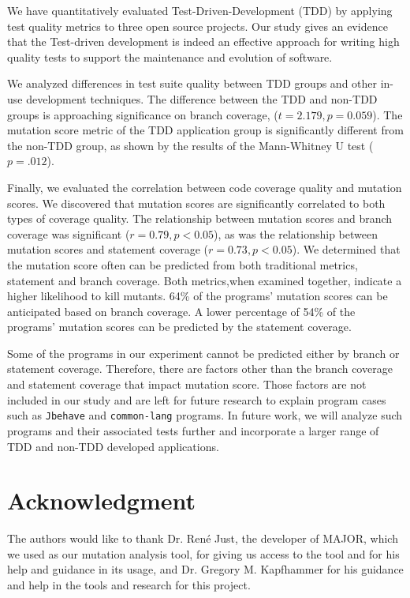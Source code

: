 \documentclass[conference]{IEEEtran}
\begin{document}
We have quantitatively evaluated Test-Driven-Development (TDD) by applying test quality metrics to three open source projects. Our study gives an evidence that the Test-driven development is indeed an effective approach for writing high quality tests to support the maintenance and evolution of software. 

We analyzed differences in test suite quality between TDD groups and other in-use development techniques. The difference between the TDD and non-TDD groups is approaching significance on branch coverage, ($t=2.179, p=0.059$). The mutation score metric of the TDD application group is significantly different from the non-TDD group, as shown by the results of the Mann-Whitney U test ($p = .012$).

Finally, we evaluated the correlation between code coverage quality and mutation scores. We discovered that mutation scores are significantly correlated to both types of coverage quality. The relationship between mutation scores and branch coverage was significant ($r = 0.79, p < 0.05$), as  was the relationship between mutation scores and  statement coverage ($r = 0.73, p < 0.05$). We determined that the mutation score often can be predicted from both traditional metrics, statement and branch coverage.  Both metrics,when examined together, indicate a higher likelihood to kill mutants. 64\% of the programs' mutation scores can be anticipated based on branch coverage.  A lower percentage of 54\% of the programs' mutation scores can be predicted by the statement coverage.

Some of the programs in our experiment cannot be predicted either by branch or statement coverage. Therefore, there are factors other than the branch coverage and statement coverage that impact mutation score. Those factors are not included in our study and are left for future research to explain program cases such as \texttt{Jbehave} and \texttt{common-lang} programs. %
In future work, we will analyze such programs and their associated tests further and incorporate a larger range of TDD and non-TDD developed applications.

\section*{Acknowledgment}
The authors would like to thank Dr. Ren\'{e} Just, the developer of MAJOR, which we used as our mutation analysis tool, for giving us access to the tool and for his help and guidance in its usage, and Dr. Gregory M. Kapfhammer for his guidance and help in the tools and research for this project.



\end{document}

